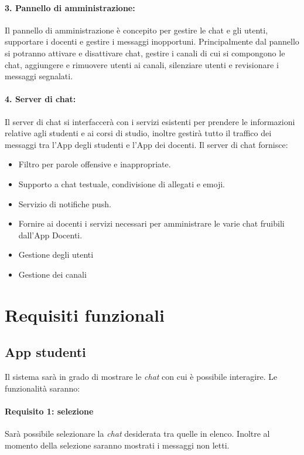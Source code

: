 \begin{enumerate}
\paragraph{3. Pannello di amministrazione:\newline}
Il pannello di amministrazione è concepito per gestire le chat e gli utenti, supportare i docenti e gestire i messaggi inopportuni. Principalmente dal pannello si potranno attivare e disattivare chat, gestire i canali di cui si compongono le chat, aggiungere e rimuovere utenti ai canali, silenziare utenti e revisionare i messaggi segnalati.

\paragraph{4. Server di chat:\newline}
Il server di chat si interfaccerà con i servizi esistenti per prendere le informazioni relative agli studenti e ai corsi di studio, inoltre gestirà tutto il traffico dei messaggi tra l'App degli studenti e l'App dei docenti.\newline
Il server di chat fornisce:
\begin{itemize}
\item Filtro per parole offensive e inappropriate.
\item Supporto a chat testuale, condivisione di allegati e emoji.
\item Servizio di notifiche push.
\item Fornire ai docenti i servizi necessari per amministrare le varie chat fruibili dall’App Docenti.
\item Gestione degli utenti
\item Gestione dei canali
\end{itemize}

\section{Requisiti funzionali}

\subsection{App studenti}
Il sistema sarà in grado di mostrare le \emph{chat} con cui è possibile interagire. Le funzionalità saranno:

\paragraph{Requisito 1: selezione\\} 
Sarà possibile selezionare la \emph{chat} desiderata tra quelle in elenco. Inoltre al momento della selezione saranno mostrati i messaggi non letti.


\end{enumerate}
